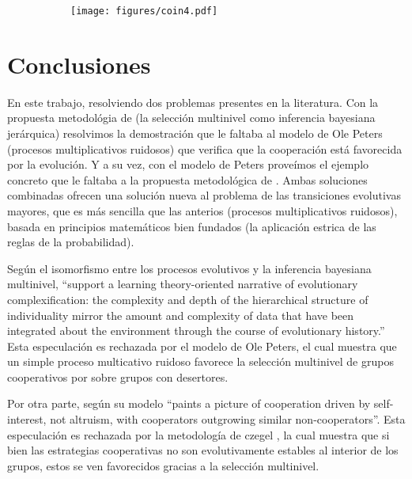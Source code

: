 \documentclass[a4paper,10pt]{article}
\begin{document}
\begin{figure}[H]
    \centering
    \begin{subfigure}[b]{0.66\textwidth}
    \texttt{[image: figures/coin4.pdf]}
    \end{subfigure}
    \caption{}
    \label{fig:fitness_temporal}
\end{figure}




\section{Conclusiones}

En este trabajo, resolviendo dos problemas presentes en la literatura.
Con la propuesta metodológia de \cite{czegel2019-bayesianEvolution} (la selección multinivel como inferencia bayesiana jerárquica) resolvimos la demostración que le faltaba al modelo de Ole Peters (procesos multiplicativos ruidosos) que verifica que la cooperación está favorecida por la evolución.
Y a su vez, con el modelo de Peters proveímos el ejemplo concreto que le faltaba a la propuesta metodológica de \cite{czegel2019-bayesianEvolution}.
Ambas soluciones combinadas ofrecen una solución nueva al problema de las transiciones evolutivas mayores, que es más sencilla que las anterios (procesos multiplicativos ruidosos), basada en principios matemáticos bien fundados (la aplicación estrica de las reglas de la probabilidad).

Según \cite{czegel2019-bayesianEvolution} el isomorfismo entre los procesos evolutivos y la inferencia bayesiana multinivel,  ``support a learning theory-oriented narrative of evolutionary complexification: the complexity and depth of the hierarchical structure of individuality mirror the amount and complexity of data that have been integrated about the environment through the course of evolutionary history.''
Esta especulación es rechazada por el modelo de Ole Peters, el cual muestra que un simple proceso multicativo ruidoso favorece la selección multinivel de grupos cooperativos por sobre grupos con desertores.

Por otra parte, según \cite{peters} su modelo ``paints a picture of cooperation driven by self-interest, not altruism, with cooperators outgrowing similar non-cooperators''.
Esta especulación es rechazada por la metodología de czegel \cite{czegel2019-bayesianEvolution}, la cual muestra que si bien las estrategias cooperativas no son evolutivamente estables al interior de los grupos, estos se ven favorecidos gracias a la selección multinivel.
\end{document}
